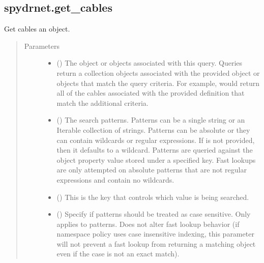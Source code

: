 \documentclass[letterpaper,10pt,english,openany,oneside]{sphinxmanual}
\begin{document}
\subsection{spydrnet.get\_cables}
\label{\detokenize{reference/classes/generated/spydrnet.get_cables:spydrnet-get-cables}}\label{\detokenize{reference/classes/generated/spydrnet.get_cables::doc}}

\begin{fulllineitems}
\label{\detokenize{reference/classes/generated/spydrnet.get_cables:spydrnet.get_cables}}
Get cables  an object.
\begin{quote}\begin{description}
\item[{Parameters}] \leavevmode\begin{itemize}
\item {} 
 () \textendash{} The object or objects associated with this query. Queries return a collection objects associated with the
provided object or objects that match the query criteria. For example,  would
return all of the cables associated with the provided definition that match the additional criteria.

\item {} 
 () \textendash{} The search patterns. Patterns can be a single string or an Iterable collection of strings. Patterns can be
absolute or they can contain wildcards or regular expressions. If  is not provided, then it defaults
to a wildcard. Patterns are queried against the object property value stored under a specified key. Fast lookups
are only attempted on absolute patterns that are not regular expressions and contain no wildcards.

\item {} 
 () \textendash{} This is the key that controls which value is being searched.

\item {} 
 () \textendash{} Specify if patterns should be treated as case sensitive. Only applies to patterns. Does not alter fast lookup
behavior (if namespace policy uses case insensitive indexing, this parameter will not prevent a fast lookup
from returning a matching object even if the case is not an exact match).


\end{itemize}
\end{description}
\end{quote}
\end{fulllineitems}
\end{document}
